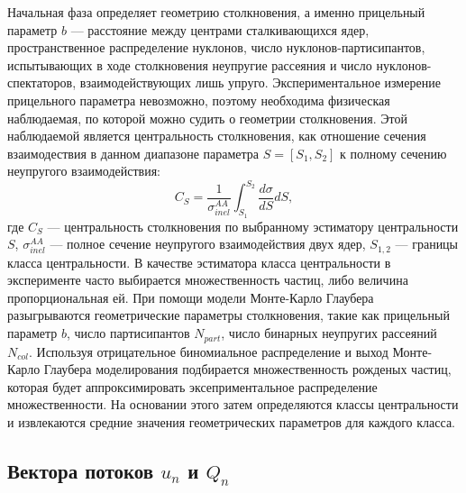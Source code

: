 Начальная фаза определяет геометрию столкновения, а именно прицельный параметр $b$ --- расстояние между центрами сталкивающихся ядер, пространственное распределение нуклонов, число нуклонов-партисипантов, испытывающих в ходе столкновения неупругие рассеяния и число нуклонов-спектаторов, взаимодействующих лишь упруго.  
Экспериментальное измерение прицельного параметра невозможно, поэтому необходима физическая наблюдаемая, по которой можно судить о геометрии столкновения.
Этой наблюдаемой является центральность столкновения, как отношение сечения взаимодествия в данном диапазоне параметра $S=[S_1, S_2]$ к полному сечению неупругого взаимодействия:
%
\begin{equation}
    C_S = \frac{1}{ \sigma_{inel}^{AA} } \int_{S_1}^{S_2} \frac{d\sigma}{dS}dS,
\end{equation}
где $C_S$ --- центральность столкновения по выбранному эстиматору центральности $S$, $\sigma_{inel}^{AA}$ --- полное сечение неупругого взаимодействия двух ядер, $S_{1,2}$ --- границы класса центральности.
В качестве эстиматора класса центральности в эксперименте часто выбирается множественность частиц, либо величина пропорциональная ей.
При помощи модели Монте-Карло Глаубера~\cite{Miller:2007ri} разыгрываются геометрические параметры столкновения, такие как прицельный параметр $b$, число партисипантов $N_{part}$, число бинарных неупругих рассеяний $N_{col}$.
Используя отрицательное биномиальное распределение и выход Монте-Карло Глаубера моделирования подбирается множественность рожденых частиц, которая будет аппроксимировать эксеприментальное распределение множественности.
На основании этого затем определяются классы центральности и извлекаются средние значения геометрических параметров для каждого класса.

\subsection{Вектора потоков $u_n$ и $Q_n$}

